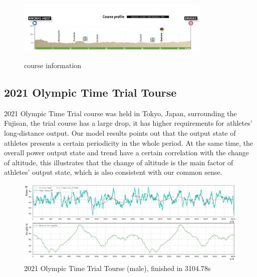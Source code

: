 \documentclass{mcmthesis}
\begin{document}
\begin{figure}[H]
{%
		\includegraphics[width=0.48\linewidth,height=2.5cm]{mcmthesis/figures/bel-man.png}
		}
	  \\
	\caption{course information}
\end{figure}
\subsection{2021 Olympic Time Trial Tourse}
2021 Olympic Time Trial course was held in Tokyo, Japan, surrounding the Fujisan, the trial course has a large drop, it has higher requirements for athletes' long-distance output. Our model results points out that the output state of athletes presents a certain periodicity in the whole period. At the same time, the overall power output state and trend have a certain correlation with the change of altitude, this illustrates that the change of altitude is the main factor of athletes' output state, which is also consistent with our common sense.

\begin{figure}[H]
\small
\centering
\includegraphics[width=13.5cm]{mcmthesis/figures/jap-m.png}
\caption{2021 Olympic Time Trial Tourse (male), finished in 3104.78s} 
\end{figure}
\end{document}
